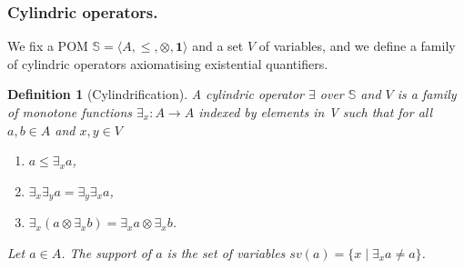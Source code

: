 \documentclass[preprint,12pt]{elsarticle}
\newtheorem{definition}{Definition}
\newcommand{\comment}[1]{}
\def\monid{{\mathbf 0}}
\def\monop{\otimes}
\def\monid{\mathbf{1}}
\begin{document}
\comment{\smallskip
	Our first step is the introduction of a technical notion that allows for 
	factorising the common properties in the definition of the two families of operators.
	
	\begin{definition}[pomonoid action]
		\label{pomo}
		Let $\mathbb{M} = \langle A, \leq, \monop, \monid \rangle$ be a partially ordered monoid and $\mathbb{P} = \langle S, \leq \rangle$ a partial order.
		A pomonoid action of $\mathbb{M}$ on $\mathbb{P}$ is a function $\phi: A \times S \rightarrow S$ such that
		\begin{itemize}
			\item $\forall s \in S.\ \phi(\monid, s) = s$,
			\item $\forall a, b \in A,\ s \in S.\ \phi(a, \phi(b, s)) = \phi(a \otimes b, s)$,
			\item $\forall a, b \in A,\ s, t \in S.\ a \leq b\, \wedge\, s \leq t \implies \phi(a, s) 
			\leq \phi (b, t)$.
		\end{itemize}
	\end{definition}
	
	The first two requirements just state
	that $\phi$ is a monoid action of $\mathbb{M}$ on $S$, while the latter states that $\phi$ is monotone. Sometimes, we say that $\mathbb{P}$ is an $\mathbb{M}$-PO.}

\subsubsection{Cylindric operators.}
We fix a POM $\mathbb{S} = \langle A, \leq, \monop, \monid \rangle$
and a set $V$ of variables, and we define a family of cylindric operators axiomatising existential quantifiers.

\begin{definition}[Cylindrification]\label{cyli}
	A cylindric operator $\exists$ over $\mathbb{S}$ and $V$ is a family of monotone functions
	$\exists_x : A \rightarrow A$ indexed by elements in V such that for all 
	$a, b \in A$ and $x, y \in V$
	\begin{enumerate}
		\item $a \leq \exists_x a$,
		\item $\exists_x \exists_y a = \exists_y \exists_x a$,
		\item $\exists_x (a \monop \exists_x b) = \exists_x a \monop \exists_x b$.
	\end{enumerate}
	
	\noindent Let $a \in A$. The \emph{support} of $a$ is the set of variables 
	$sv(a) = \{ x \mid \exists_x a \neq a\}$. 
\end{definition}
\end{document}
